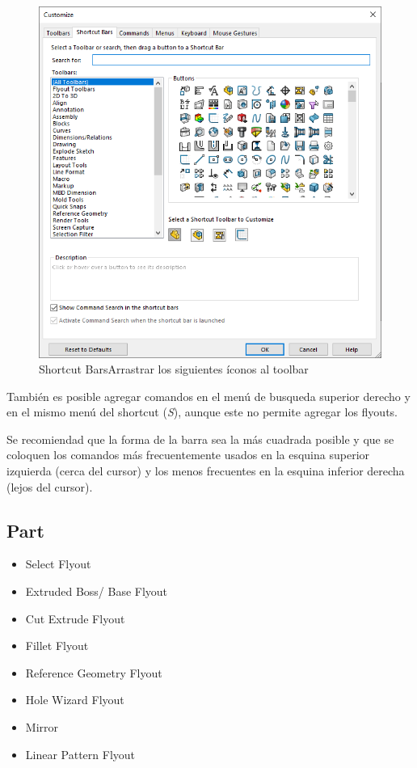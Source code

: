 \documentclass[12pt,letterpaper,final]{report}
\begin{document}
\begin{figure}[H]
	\centering
	\includegraphics[width=0.85\linewidth, height=0.5\textheight,keepaspectratio]{Imagenes/solidworks_shortcutbars_02}
	\caption{Shortcut Bars\textrightarrow Arrastrar los siguientes íconos al toolbar}
	\label{fig:solidworksshortcutbars02}
\end{figure}

También es posible agregar comandos en el menú de busqueda superior derecho y en el mismo menú del shortcut (\emph{S}), aunque este no permite agregar los flyouts.

Se recomiendad que la forma de la barra sea la más cuadrada posible y que se coloquen los comandos más frecuentemente usados en la esquina superior izquierda (cerca del cursor) y los menos frecuentes en la esquina inferior derecha (lejos del cursor).

\subsection{Part}

\begin{itemize}
	\item Select Flyout
	\item Extruded Boss/ Base Flyout
	\item Cut Extrude Flyout
	\item Fillet Flyout
	\item Reference Geometry Flyout
	\item Hole Wizard Flyout
	\item Mirror
	\item Linear Pattern Flyout
\end{itemize}
\end{document}
